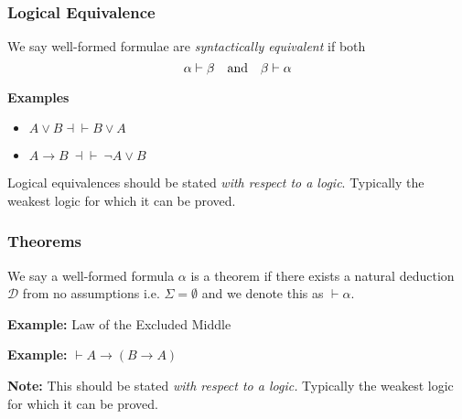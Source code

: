 \documentclass{beamer}
\begin{document}
\begin{frame}
  \frametitle{Logical Equivalence}

	\begin{center}
		
		We say well-formed formulae are \textit{syntactically equivalent} if both 
		$$ \alpha \vdash \beta \quad \textnormal{and} \quad \beta \vdash \alpha$$

	\end{center}
	
	\vspace{0.5cm}
	
	{\bf Examples} 
	\begin{itemize}
		\item $A \lor B \dashv \vdash B  \lor  A$
		\item $A \rightarrow B \ \dashv \vdash \ \lnot A \lor B$
	\end{itemize}

	Logical equivalences should be stated \emph{with respect to a logic}. Typically the weakest logic for which it can be proved.

\end{frame}

\begin{frame}
	\frametitle{Theorems}
	\begin{center} We say a well-formed formula $\alpha$ is a theorem if there exists a natural deduction $\mathcal{D}$ from no assumptions i.e. $\Sigma = \emptyset$ and we denote this as $\vdash \alpha$. \end{center}
	
	\vspace{0.5cm}
	
	{\bf Example:} Law of the Excluded Middle
	
	\vspace{0.5cm}
	
	{\bf Example:} $\vdash A \rightarrow (B \rightarrow A)$
	
	\vspace{1cm}
	
	{\bf Note:} This should be stated \emph{with respect to a logic.} Typically the weakest logic for which it can be proved.
	
\end{frame}
\end{document}
